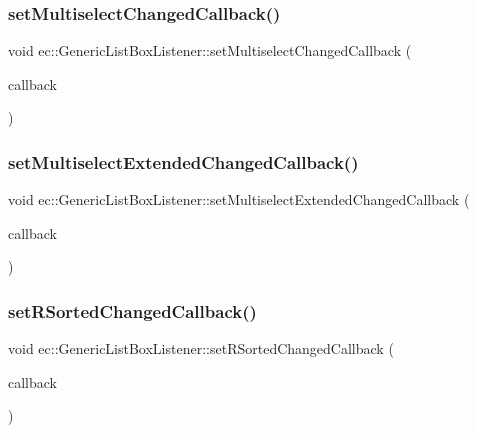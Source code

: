 \subsubsection{\texorpdfstring{set\+Multiselect\+Changed\+Callback()}{setMultiselectChangedCallback()}}
{\footnotesize\ttfamily void ec\+::\+Generic\+List\+Box\+Listener\+::set\+Multiselect\+Changed\+Callback (\begin{DoxyParamCaption}\item[{const \mbox{\hyperlink{classec_1_1_generic_list_box_listener_a5016e759cd4589d9da453ce353ddc3b2}{Multiselect\+Changed\+\_\+\+Callback}} \&}]{callback }\end{DoxyParamCaption})}

\mbox{\label{classec_1_1_generic_list_box_listener_a64eba5b8be3e967ab3d6751b9fc8979a}} 
\subsubsection{\texorpdfstring{set\+Multiselect\+Extended\+Changed\+Callback()}{setMultiselectExtendedChangedCallback()}}
{\footnotesize\ttfamily void ec\+::\+Generic\+List\+Box\+Listener\+::set\+Multiselect\+Extended\+Changed\+Callback (\begin{DoxyParamCaption}\item[{const \mbox{\hyperlink{classec_1_1_generic_list_box_listener_afafcf69d328d0d728142a5153e0b9790}{Multiselect\+Extended\+Changed\+\_\+\+Callback}} \&}]{callback }\end{DoxyParamCaption})}

\mbox{\label{classec_1_1_generic_list_box_listener_aa8d6e9c55f6178c3fec2d9142ce9586e}} 
\subsubsection{\texorpdfstring{set\+R\+Sorted\+Changed\+Callback()}{setRSortedChangedCallback()}}
{\footnotesize\ttfamily void ec\+::\+Generic\+List\+Box\+Listener\+::set\+R\+Sorted\+Changed\+Callback (\begin{DoxyParamCaption}\item[{const \mbox{\hyperlink{classec_1_1_generic_list_box_listener_a6e2b38bbcd32c3716e7660fc40c4054c}{R\+Sorted\+Changed\+\_\+\+Callback}} \&}]{callback }\end{DoxyParamCaption})}

